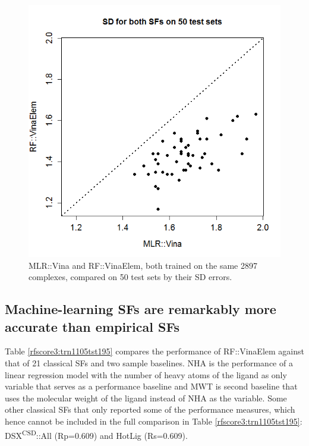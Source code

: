 \begin{figure}
\centering
\includegraphics[width=\linewidth]{../rfscore3/Models24SD.png}
\caption{MLR::Vina and RF::VinaElem, both trained on the same 2897 complexes, compared on 50 test sets by their SD errors.}
\label{rfscore3:Models24SD}
\end{figure}

\subsection{Machine-learning SFs are remarkably more accurate than empirical SFs}

Table \ref{rfscore3:trn1105tst195} compares the performance of RF::VinaElem against that of 21 classical SFs and two sample baselines. NHA is the performance of a linear regression model with the number of heavy atoms of the ligand as only variable that serves as a performance baseline and MWT is second baseline that uses the molecular weight of the ligand instead of NHA as the variable. Some other classical SFs that only reported some of the performance measures, which hence cannot be included in the full comparison in Table \ref{rfscore3:trn1105tst195}: DSX\textsuperscript{CSD}::All \citep{1460} (Rp=0.609) and HotLig \citep{1459} (Rs=0.609).

